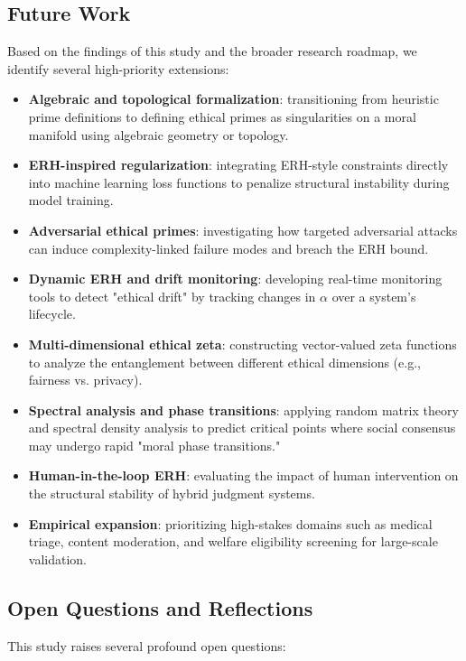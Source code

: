 \documentclass[12pt,a4paper]{article}
\theoremstyle{definition}
\theoremstyle{remark}
\begin{document}
\subsection{Future Work}

Based on the findings of this study and the broader research roadmap, we identify several high-priority extensions:

\begin{itemize}
    \item \textbf{Algebraic and topological formalization}: transitioning from heuristic prime definitions to defining ethical primes as singularities on a moral manifold using algebraic geometry or topology.
    \item \textbf{ERH-inspired regularization}: integrating ERH-style constraints directly into machine learning loss functions to penalize structural instability during model training.
    \item \textbf{Adversarial ethical primes}: investigating how targeted adversarial attacks can induce complexity-linked failure modes and breach the ERH bound.
    \item \textbf{Dynamic ERH and drift monitoring}: developing real-time monitoring tools to detect "ethical drift" by tracking changes in $\alpha$ over a system's lifecycle.
    \item \textbf{Multi-dimensional ethical zeta}: constructing vector-valued zeta functions to analyze the entanglement between different ethical dimensions (e.g., fairness vs. privacy).
    \item \textbf{Spectral analysis and phase transitions}: applying random matrix theory and spectral density analysis to predict critical points where social consensus may undergo rapid "moral phase transitions."
    \item \textbf{Human-in-the-loop ERH}: evaluating the impact of human intervention on the structural stability of hybrid judgment systems.
    \item \textbf{Empirical expansion}: prioritizing high-stakes domains such as medical triage, content moderation, and welfare eligibility screening for large-scale validation.
\end{itemize}

\subsection{Open Questions and Reflections}

This study raises several profound open questions:
\end{document}
